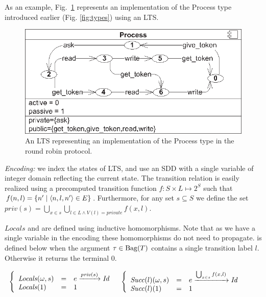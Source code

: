 As an example, Fig.~\ref{fig:lts} represents an implementation of the Process type introduced earlier (Fig. \ref{fig:types}) using an LTS.
\begin{figure}[htbp]
\center
\includegraphics[scale=0.8]{lts-fig.eps}
\caption{An LTS representing an implementation of the Process type in the round robin protocol. \label{fig:lts}}
\end{figure}

\emph{Encoding:} we index the states of LTS, and use an SDD with a single
variable of integer domain reflecting the current state. The transition
relation is easily realized using a precomputed transition function $f:S
\times L \mapsto 2^S$ such that $f(n,l) = \{ n' \mid \langle {n,l,n'} \rangle \in E \}$.
Furthermore, for any set $s \subseteq S$ we define the set $\mathit{priv}(s) = \bigcup_{x
\in s} \bigcup_{l \in L \land V(l)=private} f(x,l)$.

$\mathit{Locals}$ and \succs{} are defined using inductive homomorphisms.
Note that as we have a single variable in the encoding these homomorphisms do not need to propagate.
\succs{} is defined below when the argument $\tau \in \mathrm{Bag}(T)$ contains a single transition label $l$.
Otherwise it returns the terminal $0$.

$
\begin{array}{ll}
\left\{
\begin{array}{lcl}
\mathit{Locals} (\omega,s) & = & e \xrightarrow{\scriptstyle {\mathit{priv}(s)}} \mathit{Id}{} \\
\mathit{Locals} (1) &=& 1
\end{array}
\right.
&
\left\{
\begin{array}{lcl}
\mathit{Succ} (l)(\omega,s)& = &e \xrightarrow{\scriptstyle {\bigcup_{x \in s} f(x,l)}} \mathit{Id}{} \\
\mathit{Succ} (l)(1) &= &1
\end{array}
\right.
\end{array}
$


